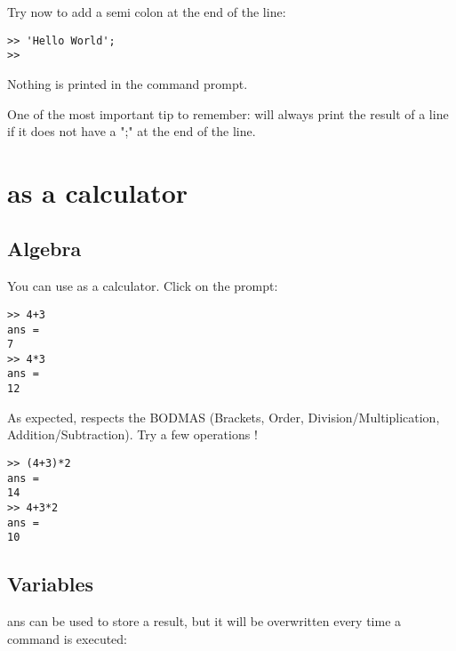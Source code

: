 Try now to add a semi colon at the end of the line:
\begin{lstlisting}
>> 'Hello World';
>>
\end{lstlisting}

Nothing is printed in the command prompt.


One of the most important tip to remember: \matlab will always print the result of a line if it does not have a ";" at the end of the line.







\section{\matlab as a calculator}
\subsection{Algebra}

You can use \matlab as a calculator. 
Click on the prompt: 

\begin{lstlisting}
>> 4+3
ans =
7
>> 4*3
ans =
12
\end{lstlisting}

As expected, \matlab respects the BODMAS (Brackets, Order, Division/Multiplication, Addition/Subtraction). 
Try a few operations !
\begin{lstlisting}
>> (4+3)*2
ans =
14
>> 4+3*2
ans =
10
\end{lstlisting}

\subsection{Variables}
ans can be used to store a result, but it will be overwritten every time a command is executed:


